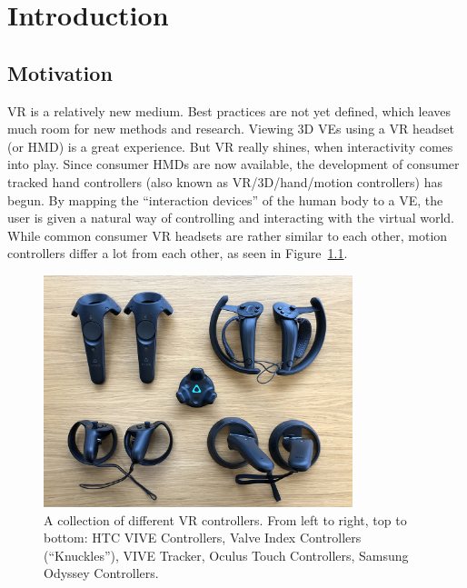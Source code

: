 \chapter{Introduction}\label{chapter:introduction}

\section{Motivation}\label{section:motivation}

\begin{sloppypar}%
  \ac{VR} is a relatively new medium. Best practices are not yet defined, which leaves much room for new methods and research. Viewing \ac{3D} \acp{VE} using a \ac{VR} headset (or \ac{HMD}) is a great experience. But \ac{VR} really shines, when interactivity comes into play. Since consumer \acp{HMD} are now available, the development of consumer tracked hand controllers (also known as \ac{VR}/\ac{3D}/hand/motion controllers) has begun. By mapping the \enquote{interaction devices} of the human body to a \ac{VE}, the user is given a natural way of controlling and interacting with the virtual world. While common consumer \ac{VR} headsets are rather similar to each other, motion controllers differ a lot from each other, as seen in Figure~\ref{fig:vr-controllers}.
\end{sloppypar}%

\begin{figure}[H]%
  \centering%
  \includegraphics[width=9cm]{figures/vr_controllers.jpg}%
  \caption[Collection of VR controllers]{A collection of different \ac{VR} controllers. From left to right, top to bottom: HTC VIVE Controllers, Valve Index Controllers (\enquote{Knuckles}), VIVE Tracker, Oculus Touch Controllers, Samsung Odyssey Controllers.}\label{fig:vr-controllers}
\end{figure}

